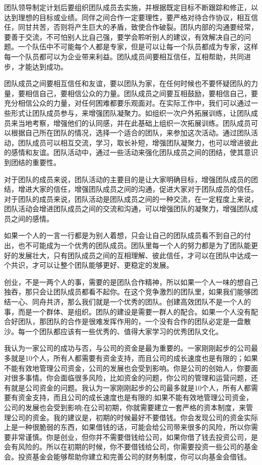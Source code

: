 \documentclass[UTF8]{article}
\begin{document}
团队领导制定计划后要组织团队成员去实施，并根据既定目标不断跟踪和修正，以达到理想的目标或业绩。同伴之间合作一定要理性，要严格对待合作协议，相互信任，同甘共苦，否则将产生巨大的矛盾，致使合作破裂。团队内部的沟通要经常，要善于交流，不可怕别人比自己强，要学会聆听别人的建议，有效解决自己的问题。一个队伍中不可能每个人都是专家，但是可以让每一个队员都成为专家，这样每一个队员都可以为企业带来利益。团队成员间要相互信任，互相帮助，共同进步，才能达到成功。

团队成员之间要相互信任和友谊，要以团队为家，在任何时候也不要怀疑团队的力量，要相信自己，要相信公众的力量。团队成员之间要互相鼓励，要相信自己，要充分相信公众的力量，对任何困难都要乐观面对。在实际工作中，我们可以通过一些形式让团队成员参与，来增强团队凝聚力。如组织一次户外拓展训练，让团队成员来当地考察，增强他们的认同感，并在此基础上组织一次拓展训练。团队成员可以根据自己所在团队的情况，选择一个适合的团队，来参加这次活动。通过团队活动，团队成员可以相互交流，学习，取长补短，增强团队凝聚力，也可以增进彼此的感情和友谊。团队活动中，通过一些活动来强化团队成员之间的团结，使其意识到团结的重要性。

对于团队的成员来说，团队活动的主要目的是让大家明确目标，增强团队成员的团结，增进大家的信任，增强团队成员之间的沟通，促进大家对于团队成员的信任。对于团队的成员来说，团队活动是团队成员之间的一种交流，在一定程度上来说，团队活动会增进团队成员之间的交流和沟通，可以增强团队的凝聚力，增强团队成员之间的感情。

如果一个人的一言一行都是为别人着想，只会让自己的团队成员看不到自己的付出，也不可能成为一个优秀的团队成员。团队里每一个人的努力都是为了团队能更好的发展壮大，只有团队成员之间的互相理解、彼此信任，才可以在团队中达成一个共识，才可以让整个团队能够更好、更稳定的发展。

创业，不是一两个人的事，需要的是团队合作精神，所以如果一个人一味的想自己独吞，那只会让团队成员都看不起你。在这个竞争激烈的团队里，如果我们能够团结一心、同舟共济，那么我们就是一个优秀的团队。创建高效团队不是一个人的事，而是一个群体、是组织。团队的建设是需要一群人的配合。如果一个人没有配合好团队，那团队的合作是很难发挥作用的，一个没有合作的团队必定是一盘散沙。每一个团队都应该有一些优秀的、值得大家学习的优秀团队文化。

我认为一家公司的成功与否，与公司的资金是最为重要的。一家刚刚起步的公司最多就是10个人，所有人都需要有资金支持，而且公司的成长速度也是有限的；如果不能有效地管理公司资金，公司的发展也会受到影响。你是公司的创始人，你要面对很多事情。你会面临很多风险，比如资金的问题，你公司的管理和运营问题，还有就是公司资金的问题。我认为一家刚刚起步的公司最多就是10个人，所有人都需要有资金支持，而且公司的成长速度也是有限的;如果不能有效地管理公司资金，公司的发展也会受到影响;在公司初期，你就需要建立一套严格的资本制度，来管理公司的资金。我的建议是，初期的时候最好不要借钱。你会发现公司的资金实际上是一种很脆弱的东西，如果借钱的话，可能会给公司带来很多的风险，所以你需要非常谨慎。你是创业，但你并不需要借钱给公司，如果你借了钱去投资公司，是会有风险的。所以在初期的时候，你不要借钱给公司，你需要投资一些公司的基金会。投资基金会能够帮助你建立和完善公司的财务制度，你可以向基金会借钱。
\end{document}
